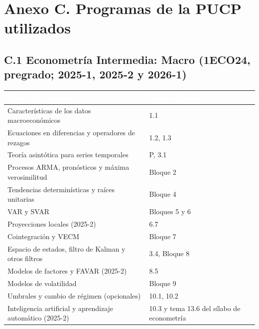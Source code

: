 \documentclass[11pt,a4paper]{article}
\newcommand{\cab}[1]{\textcolor{white}{\sffamily\bfseries #1}}
\newcommand{\filasalternas}{\rowcolors{2}{white}{tonoPalido}}
\begin{document}
\section*{Anexo C. Programas de la PUCP utilizados}

\subsection*{C.1 Econometría Intermedia: Macro (1ECO24, pregrado; 2025-1, 2025-2 y 2026-1)}
{\small\filasalternas
\noindent\begin{tabularx}{\textwidth}{>{\raggedright\arraybackslash}p{6.2cm}X}
\toprule
\rowcolor{tonoOscuro}\cab{Tema del programa} & \cab{Temas del plan} \\
\midrule
Características de los datos macroeconómicos & 1.1 \\
Ecuaciones en diferencias y operadores de rezagos & 1.2, 1.3 \\
Teoría asintótica para series temporales & P, 3.1 \\
Procesos ARMA, pronósticos y máxima verosimilitud & Bloque 2 \\
Tendencias determinísticas y raíces unitarias & Bloque 4 \\
VAR y SVAR & Bloques 5 y 6 \\
Proyecciones locales (2025-2) & 6.7 \\
Cointegración y VECM & Bloque 7 \\
Espacio de estados, filtro de Kalman y otros filtros & 3.4, Bloque 8 \\
Modelos de factores y FAVAR (2025-2) & 8.5 \\
Modelos de volatilidad & Bloque 9 \\
Umbrales y cambio de régimen (opcionales) & 10.1, 10.2 \\
Inteligencia artificial y aprendizaje automático (2025-2) & 10.3 y tema 13.6 del sílabo de econometría \\
\bottomrule
\end{tabularx}
}
\end{document}
